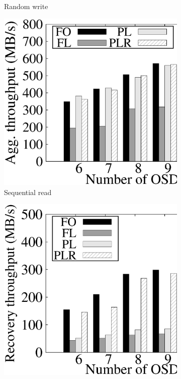 \begin{figure}[t]
\begin{subfigure}[t]{0.48\linewidth}
     \caption{Random write}
	 \label{fig:rand_write}
 \end{subfigure}
 \begin{subfigure}[t]{0.48\linewidth}
     \includegraphics[width=\linewidth]{charts/seq_read/eps/seq_read}
     \caption{Sequential read}
	 \label{fig:seq_read}
 \end{subfigure}
 \begin{subfigure}[t]{0.48\linewidth}
     \includegraphics[width=\linewidth]{charts/recovery/eps/recovery}

\end{subfigure}
\end{figure}
